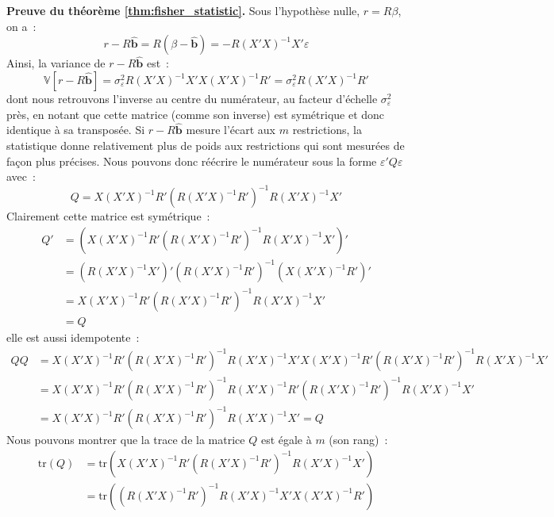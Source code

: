 \documentclass[10pt]{beamer}
\theoremstyle{plain}
\begin{document}
\begin{notes}

  \textbf{Preuve du théorème \ref{thm:fisher_statistic}.} Sous l'hypothèse nulle, $r=R\beta$, on a~:
    \[
      r-R\hat{\mathbf b} = R\left( \beta - \hat{\mathbf b} \right) = -R(X'X)^{-1}X'\varepsilon
    \]
    Ainsi, la variance de $r-R\hat{\mathbf b}$ est~:
    \[
      \mathbb V \left[ r-R\hat{\mathbf b} \right] = \sigma_{\varepsilon}^2R(X'X)^{-1}X'X(X'X)^{-1}R' = \sigma_{\varepsilon}^2R(X'X)^{-1}R'
    \]
    dont nous retrouvons l'inverse au centre du numérateur, au facteur
    d'échelle $\sigma_{\varepsilon}^2$ près, en notant que cette
    matrice (comme son inverse) est symétrique et donc identique à sa
    transposée. Si $r-R\hat{\mathbf b}$ mesure l'écart aux $m$
    restrictions, la statistique donne relativement plus de poids aux
    restrictions qui sont mesurées de façon plus précises. Nous pouvons donc réécrire le numérateur sous la forme $\varepsilon' Q \varepsilon$ avec~:
    \[
      Q = X(X'X)^{-1}R'\left( R(X'X)^{-1}R' \right)^{-1}R(X'X)^{-1}X'
    \]
    Clairement cette matrice est symétrique~:
    \[
      \begin{split}
        Q' &= \left( X(X'X)^{-1}R'\left( R(X'X)^{-1}R' \right)^{-1}R(X'X)^{-1}X' \right)'\\
           &= \left( R(X'X)^{-1}X' \right)'\left( R(X'X)^{-1}R' \right)^{-1}\left( X(X'X)^{-1}R' \right)'\\
           &= X(X'X)^{-1}R'\left( R(X'X)^{-1}R' \right)^{-1}R(X'X)^{-1}X'\\
           &= Q
      \end{split}
    \]
  elle est aussi idempotente~:
    {\tiny
    \[
      \begin{split}
        QQ &= X(X'X)^{-1}R'\left( R(X'X)^{-1}R' \right)^{-1}R(X'X)^{-1}X' X(X'X)^{-1}R'\left( R(X'X)^{-1}R' \right)^{-1}R(X'X)^{-1}X'\\
           &= X(X'X)^{-1}R'\left( R(X'X)^{-1}R' \right)^{-1}R(X'X)^{-1}R'\left( R(X'X)^{-1}R' \right)^{-1}R(X'X)^{-1}X'\\
           &= X(X'X)^{-1}R'\left( R(X'X)^{-1}R' \right)^{-1}R(X'X)^{-1}X' = Q
      \end{split}
    \]}
  Nous pouvons montrer que la trace de la matrice $Q$ est égale à $m$ (son rang)~:
    \[
      \begin{split}
        \mathrm{tr} (Q) &= \mathrm{tr}\left( X(X'X)^{-1}R'\left( R(X'X)^{-1}R' \right)^{-1}R(X'X)^{-1}X'  \right) \\
                         &= \mathrm{tr}\left( \left( R(X'X)^{-1}R' \right)^{-1}R(X'X)^{-1}X'X(X'X)^{-1}R'   \right)\\

\end{split}\]
\end{notes}
\end{document}
